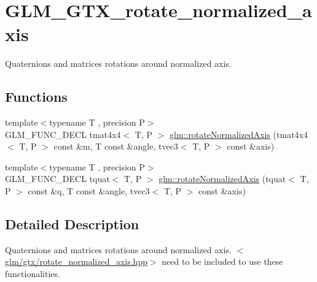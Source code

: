 \hypertarget{group__gtx__rotate__normalized__axis}{\section{G\-L\-M\-\_\-\-G\-T\-X\-\_\-rotate\-\_\-normalized\-\_\-axis}
\label{group__gtx__rotate__normalized__axis}
}


Quaternions and matrices rotations around normalized axis.  


\subsection*{Functions}
\begin{DoxyCompactItemize}
\item 
{\footnotesize template$<$typename T , precision P$>$ }\\G\-L\-M\-\_\-\-F\-U\-N\-C\-\_\-\-D\-E\-C\-L tmat4x4$<$ T, P $>$ \hyperlink{group__gtx__rotate__normalized__axis_gaada623964a895def5a8b77b5b7887dc4}{glm\-::rotate\-Normalized\-Axis} (tmat4x4$<$ T, P $>$ const \&m, T const \&angle, tvec3$<$ T, P $>$ const \&axis)
\item 
{\footnotesize template$<$typename T , precision P$>$ }\\G\-L\-M\-\_\-\-F\-U\-N\-C\-\_\-\-D\-E\-C\-L tquat$<$ T, P $>$ \hyperlink{group__gtx__rotate__normalized__axis_ga6c00234d844faef36a6a94669fbd1639}{glm\-::rotate\-Normalized\-Axis} (tquat$<$ T, P $>$ const \&q, T const \&angle, tvec3$<$ T, P $>$ const \&axis)
\end{DoxyCompactItemize}


\subsection{Detailed Description}
Quaternions and matrices rotations around normalized axis. $<$\hyperlink{rotate__normalized__axis_8hpp}{glm/gtx/rotate\-\_\-normalized\-\_\-axis.\-hpp}$>$ need to be included to use these functionalities. 

